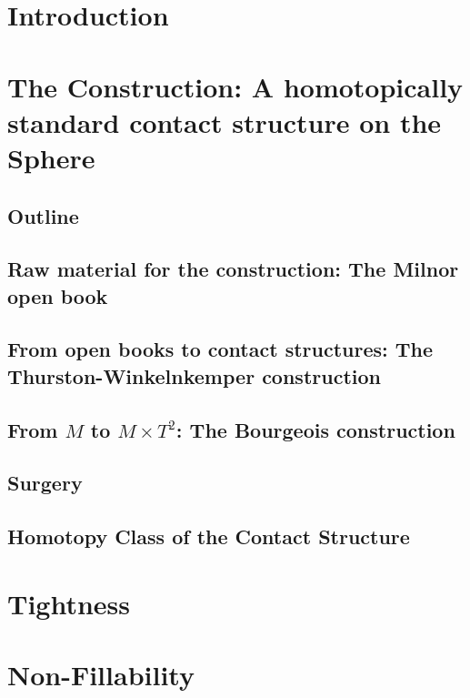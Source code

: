 \documentclass[oneside]{amsbook}
\begin{document}

\chapter{Introduction}

\chapter[Construction]{The Construction: A homotopically standard contact structure on the Sphere}
\section{Outline}

\section[The Milnor open book]{Raw material for the construction: The Milnor open book}

\section[The Thurston-Winkelnkemper-construction]{From open books to contact structures: The Thurston-Winkelnkemper construction}

\section[The Bourgeois construction]{From $M$ to $M\times T^2$: The Bourgeois construction}


\section{Surgery}


\section[Homotopically standard]{Homotopy Class of the Contact Structure}

\chapter{Tightness}

\chapter{Non-Fillability}

\newpage


\end{document}
